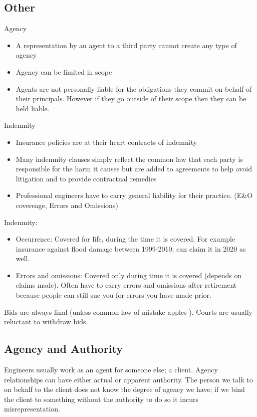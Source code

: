 \documentclass[10pt]{article}
\begin{document}
\subsection{Other}

Agency
\begin{itemize}
	\item  A representation by an agent to a third party cannot create any type of agency
	\item Agency can be limited in scope
	\item Agents are not personally liable for the obligations they commit on behalf of their principals. However if they go outside of their scope then they can be held liable.

\end{itemize}

Indemnity
\begin{itemize}
	\item Insurance policies are at their heart contracts of indemnity
	\item Many indemnity clauses simply reflect the common law that each party is responsible for the harm it causes but are added to agreements to help avoid litigation and to provide contractual remedies
	\item Professional engineers have to carry general liability for their practice. (E\&O covereage, Errors and Omissions)
\end{itemize}

Indemnity:
\begin{itemize}
	\item Occurrence: Covered for life, during the time it is covered. For example insurance against flood damage between 1999-2010; can claim it in 2020 as well.
	\item Errors and omissions: Covered only during time it is covered (depends on claims made). Often have to carry errors and omissions after retirement because people can still sue you for errors you have made prior.
\end{itemize}



Bids are always final (unless common law of  mistake apples ). Courts are usually reluctant to withdraw bids.  




\subsection{Agency and Authority}
Engineers usually work as an agent for someone else; a client. Agency relationships can have either actual or apparent authority. 
The person we talk to on behalf to the client does not know the degree of agency we have; if we bind the client to something without the authority to do so it incurs misrepresentation.
\end{document}
